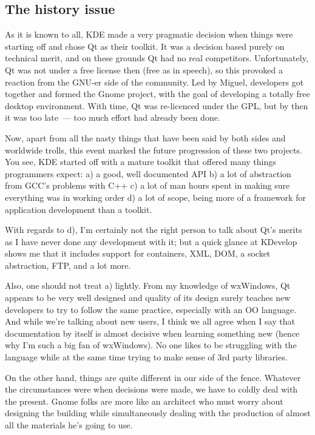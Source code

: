 \documentclass{memoir}
\begin{document}
\subsection{The history issue}

As it is known to all, KDE made a very pragmatic decision when things
were starting off and chose Qt as their toolkit. It was a decision
based purely on technical merit, and on these grounds Qt had no real
competitors. Unfortunately, Qt was not under a free license then (free
as in speech), so this provoked a reaction from the GNU-er side of the
community. Led by Miguel, developers got together and formed the Gnome
project, with the goal of developing a totally free desktop
environment. With time, Qt was re-licenced under the GPL, but by then
it was too late~--- too much effort had already been done.

Now, apart from all the nasty things that have been said by both sides
and worldwide trolls, this event marked the future progression of
these two projects. You see, KDE started off with a mature toolkit
that offered many things programmers expect: a) a good, well
documented API b) a lot of abstraction from GCC's problems
with C++ c) a lot of man hours spent in making sure everything was in
working order d) a lot of scope, being more of a framework for
application development than a toolkit.

With regards to d), I'm certainly not the right person to talk about
Qt's merits as I have never done any development with it; but a quick
glance at KDevelop shows me that it includes support for containers,
XML, DOM, a socket abstraction, FTP, and a lot more.

Also, one should not treat a) lightly. From my knowledge of wxWindows,
Qt appears to be very well designed and quality of its design surely
teaches new developers to try to follow the same practice, especially
with an OO language. And while we're talking about new users,
I think we all agree when I say that documentation by itself is almost
decisive when learning something new (hence why I'm such a big
fan of wxWindows). No one likes to be struggling with the language
while at the same time trying to make sense of 3rd party libraries.

On the other hand, things are quite different in our side of the
fence. Whatever the circumstances were when decisions were made, we
have to coldly deal with the present. Gnome folks are more like an
architect who must worry about designing the building while
simultaneously dealing with the production of almost all the materials
he's going to use.
\end{document}
